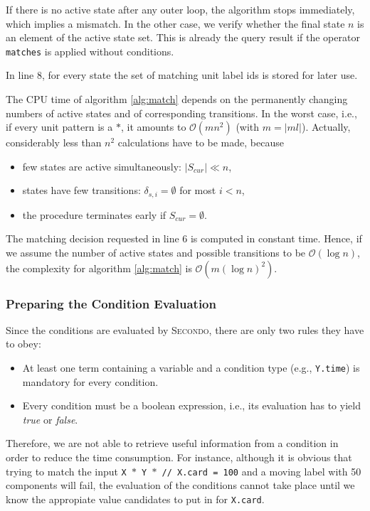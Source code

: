 \documentclass{sig-alternate}
\newcommand{\ic}[1]{\textit{#1}}
\newcommand{\secondo}{\textsc{Secondo}}
\begin{document}
If there is no active state after any outer loop, the algorithm stops immediately, which implies a mismatch. In the other case, we verify whether the final state $n$ is an element of the active state set. This is already the query result if the operator \texttt{matches} is applied without conditions.

In line 8, for every state the set of matching unit label ids is stored for later use.

The CPU time of algorithm \ref{alg:match} depends on the permanently changing numbers of active states and of corresponding transitions. In the worst case, i.e., if every unit pattern is a $\ast$, it amounts to $\mathcal O(mn^2)$ (with $m=\left|ml\right|$). Actually, considerably less than $n^2$ calculations have to be made, because
\begin{itemize}
  \item few states are active simultaneously: $\left|S_{cur}\right|\ll n$,
  \item states have few transitions: $\delta_{s,i}=\emptyset$ for most $i<n$,
  \item the procedure terminates early if $S_{cur}=\emptyset$.
\end{itemize}

The matching decision requested in line 6 is computed in constant time. Hence, if we assume the number of active states and possible transitions to be $\mathcal O(\log n)$, the complexity for algorithm \ref{alg:match} is $\mathcal O(m(\log n)^2)$.

\subsubsection{Preparing the Condition Evaluation}\label{sec:preparing the condition evaluation}
Since the conditions are evaluated by \secondo, there are only two rules they have to obey:
\begin{itemize}
  \item At least one term containing a variable and a condition type (e.g., \texttt{Y.time}) is mandatory for every condition.
  \item Every condition must be a boolean expression, i.e., its evaluation has to yield \ic{true} or \ic{false}.
\end{itemize}

Therefore, we are not able to retrieve useful information from a condition in order to reduce the time consumption. For instance, although it is obvious that trying to match the input \texttt{X $\ast$ Y $\ast$ // X.card = 100} and a moving label with 50 components will fail, the evaluation of the conditions cannot take place until we know the appropiate value candidates to put in for \texttt{X.card}.
\end{document}
